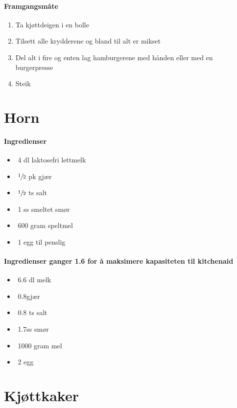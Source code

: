 \documentclass[12pt,a4paper]{book}
\begin{document}
\paragraph{Framgangsmåte}
\begin{enumerate}[noitemsep]
	\item Ta kjøttdeigen i en bolle
	\item Tilsett alle krydderene og bland til alt er mikset
	\item Del alt i fire og enten lag hamburgerene med hånden eller med en burgerpresse
	\item Steik
\end{enumerate}
\clearpage{}
\clearpage{}\section{﻿Horn}


\paragraph{Ingredienser}
\begin{itemize}[noitemsep]
	\item﻿ 4 dl laktosefri lettmelk
	\item﻿ $\sfrac{1}{2}$ pk gjær
	\item﻿  $\sfrac{1}{2}$  ts salt
	\item﻿ 1 ss smeltet smør
	\item﻿ 600 gram speltmel
	\item﻿ 1 egg til penslig
\end{itemize}

\paragraph{Ingredienser ganger 1.6 for å maksimere kapasiteten til kitchenaid}
\begin{itemize}[noitemsep]
	\item﻿ 6.6 dl melk
	\item﻿ 0.8gjær
	\item﻿ 0.8 ts salt
	\item﻿ 1.7ss smør
	\item﻿ 1000 gram mel
	\item﻿ 2 egg
\end{itemize}

\clearpage{}
\clearpage{}\clearpage{}
\clearpage{}\section{﻿Kjøttkaker}
\end{document}
